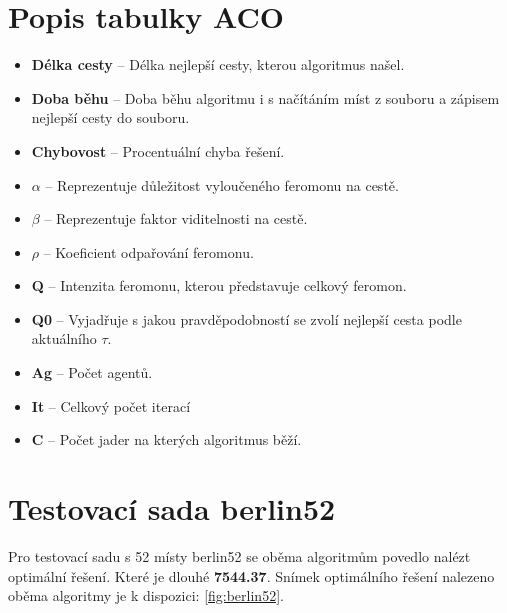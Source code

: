 \section{Popis tabulky ACO}
    \begin{itemize}
    \item \textbf{Délka cesty} -- Délka nejlepší cesty, kterou algoritmus našel. 
    \item \textbf{Doba běhu} -- Doba běhu algoritmu i s načítáním míst z souboru a zápisem nejlepší cesty do souboru.  
    \item \textbf{Chybovost} -- Procentuální chyba řešení.
    \item \textbf{$\alpha$} -- Reprezentuje důležitost vyloučeného feromonu na cestě.
    \item \textbf{$\beta$} -- Reprezentuje faktor viditelnosti na cestě.
    \item \textbf{$\rho$} -- Koeficient odpařování feromonu. 
    \item \textbf{Q} -- Intenzita feromonu, kterou představuje celkový feromon. 
    \item \textbf{Q0} -- Vyjadřuje s jakou pravděpodobností se zvolí nejlepší cesta podle aktuálního $\tau$.
    \item \textbf{Ag} -- Počet agentů.
    \item \textbf{It} -- Celkový počet iterací 
    \item \textbf{C} -- Počet jader na kterých algoritmus běží. 
\end{itemize}



\section{Testovací sada berlin52}
Pro testovací sadu s 52 místy berlin52 se oběma algoritmům povedlo nalézt optimální řešení. Které je dlouhé \textbf{7544.37}. Snímek optimálního řešení nalezeno oběma algoritmy je k dispozici: \ref{fig:berlin52}.  

\begin{table}[H]
\caption{berlin52-ACO}
\end{table}

